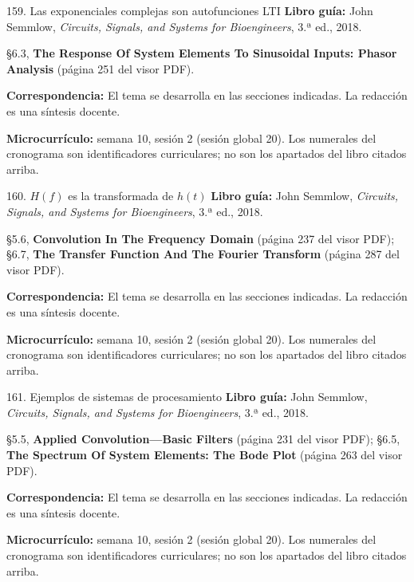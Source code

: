 \documentclass[
  10pt,
  ignorenonframetext,
  aspectratio=169,
  spanish,
]{beamer}
\begin{document}
\begin{frame}{159. Las exponenciales complejas son autofunciones LTI}
\label{las-exponenciales-complejas-son-autofunciones-lti}
\textbf{Libro guía:} John Semmlow, \emph{Circuits, Signals, and Systems
for Bioengineers}, 3.ª ed., 2018.

§6.3, \textbf{The Response Of System Elements To Sinusoidal Inputs:
Phasor Analysis} (página 251 del visor PDF).

\textbf{Correspondencia:} El tema se desarrolla en las secciones
indicadas. La redacción es una síntesis docente.

\textbf{Microcurrículo:} semana 10, sesión 2 (sesión global 20). Los
numerales del cronograma son identificadores curriculares; no son los
apartados del libro citados arriba.
\end{frame}

\begin{frame}{160. \(H(f)\) es la transformada de \(h(t)\)}
\label{hf-es-la-transformada-de-ht}
\textbf{Libro guía:} John Semmlow, \emph{Circuits, Signals, and Systems
for Bioengineers}, 3.ª ed., 2018.

§5.6, \textbf{Convolution In The Frequency Domain} (página 237 del visor
PDF); §6.7, \textbf{The Transfer Function And The Fourier Transform}
(página 287 del visor PDF).

\textbf{Correspondencia:} El tema se desarrolla en las secciones
indicadas. La redacción es una síntesis docente.

\textbf{Microcurrículo:} semana 10, sesión 2 (sesión global 20). Los
numerales del cronograma son identificadores curriculares; no son los
apartados del libro citados arriba.
\end{frame}

\begin{frame}{161. Ejemplos de sistemas de procesamiento}
\label{ejemplos-de-sistemas-de-procesamiento}
\textbf{Libro guía:} John Semmlow, \emph{Circuits, Signals, and Systems
for Bioengineers}, 3.ª ed., 2018.

§5.5, \textbf{Applied Convolution---Basic Filters} (página 231 del visor
PDF); §6.5, \textbf{The Spectrum Of System Elements: The Bode Plot}
(página 263 del visor PDF).

\textbf{Correspondencia:} El tema se desarrolla en las secciones
indicadas. La redacción es una síntesis docente.

\textbf{Microcurrículo:} semana 10, sesión 2 (sesión global 20). Los
numerales del cronograma son identificadores curriculares; no son los
apartados del libro citados arriba.
\end{frame}
\end{document}
